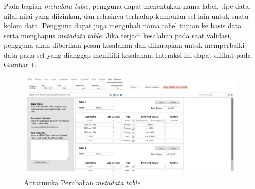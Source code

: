 Pada bagian \textit{metadata table}, pengguna dapat menentukan nama label, tipe data, nilai-nilai yang diizinkan, dan relasinya terhadap kumpulan sel lain untuk suatu kolom data. Pengguna dapat juga mengubah nama tabel tujuan ke basis data serta menghapus \textit{metadata table}. Jika terjadi kesalahan pada saat validasi, pengguna akan diberikan pesan kesalahan dan diharapkan untuk memperbaiki data pada sel yang dianggap memiliki kesalahan. Interaksi ini dapat dilihat pada Gambar \ref{Antarmuka3}.

\begin{figure}[htbp]
	\centering
	\includegraphics[width=1.0\textwidth]{resources/chapter-4-interface-3a.png}
	\caption{Antarmuka Perubahan \textit{metadata table}}
	\label{Antarmuka3}
\end{figure}

